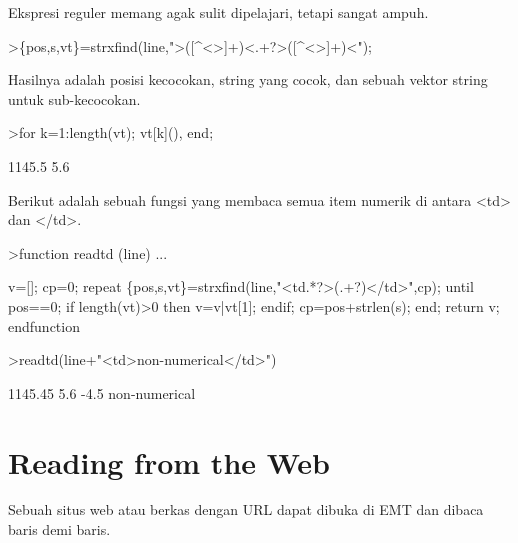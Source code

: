 \documentclass{article}
\newenvironment{eulernotebook}{\par}{\par}
\newcommand{\eulerheading}[1]{\section{#1}}
\newenvironment{eulercomment}{\par\medskip}{\par\medskip}
\begin{document}
\begin{eulernotebook}
\begin{eulercomment}
\begin{eulercomment}
\begin{eulercomment}
\begin{eulercomment}
\begin{eulercomment}
\begin{eulercomment}
\begin{eulercomment}
Ekspresi reguler memang agak sulit dipelajari, tetapi sangat ampuh.
\end{eulercomment}
\begin{eulerprompt}
>\{pos,s,vt\}=strxfind(line,">([^<>]+)<.+?>([^<>]+)<");
\end{eulerprompt}
\begin{eulercomment}
Hasilnya adalah posisi kecocokan, string yang cocok, dan sebuah vektor
string untuk sub-kecocokan.
\end{eulercomment}
\begin{eulerprompt}
>for k=1:length(vt); vt[k](), end;
\end{eulerprompt}
\begin{euleroutput}
  1145.5
  5.6
\end{euleroutput}
\begin{eulercomment}
Berikut adalah sebuah fungsi yang membaca semua item numerik di antara
\textless{}td\textgreater{} dan \textless{}/td\textgreater{}.
\end{eulercomment}
\begin{eulerprompt}
>function readtd (line) ...
\end{eulerprompt}
\begin{eulerudf}
  v=[]; cp=0;
  repeat
     \{pos,s,vt\}=strxfind(line,"<td.*?>(.+?)</td>",cp);
     until pos==0;
     if length(vt)>0 then v=v|vt[1]; endif;
     cp=pos+strlen(s);
  end;
  return v;
  endfunction
\end{eulerudf}
\begin{eulerprompt}
>readtd(line+"<td>non-numerical</td>")
\end{eulerprompt}
\begin{euleroutput}
  1145.45
  5.6
  -4.5
  non-numerical
\end{euleroutput}
\eulerheading{Reading from the Web}
\begin{eulercomment}
Sebuah situs web atau berkas dengan URL dapat dibuka di EMT dan dibaca
baris demi baris.


\end{eulercomment}
\end{eulercomment}
\end{eulercomment}
\end{eulercomment}
\end{eulercomment}
\end{eulercomment}
\end{eulercomment}
\end{eulernotebook}
\end{document}

